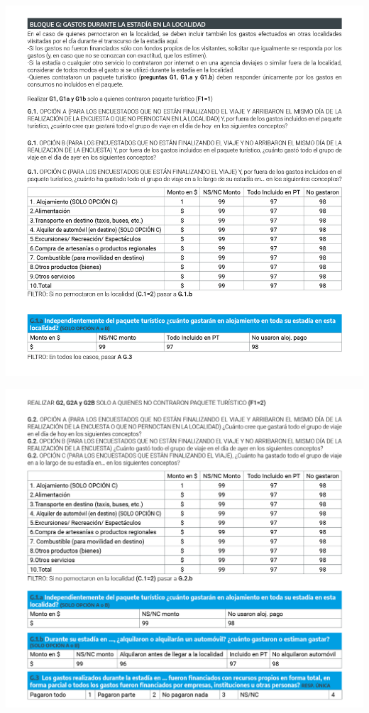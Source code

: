 \documentclass[
]{book}
\begin{document}
\begin{center}\includegraphics[width=1\linewidth]{imagenes/graf09} \end{center}

\begin{center}\includegraphics[width=1\linewidth]{imagenes/graf10} \end{center}
\end{document}
